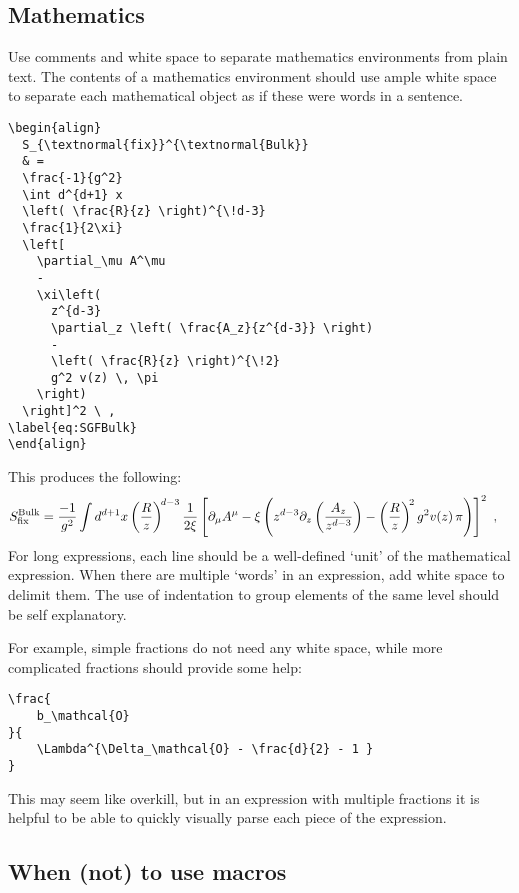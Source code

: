 \subsection{Mathematics}

Use comments and white space to separate mathematics environments from plain text.
% 
The contents of a mathematics environment should use ample white space to separate each mathematical object as if these were words in a sentence.
% 
\begin{lstlisting}[style=latexstyle]
\begin{align}
  S_{\textnormal{fix}}^{\textnormal{Bulk}}
  & =
  \frac{-1}{g^2} 
  \int d^{d+1} x  
  \left( \frac{R}{z} \right)^{\!d-3}
  \frac{1}{2\xi}
  \left[
    \partial_\mu A^\mu
    -
    \xi\left( 
      z^{d-3} 
      \partial_z \left( \frac{A_z}{z^{d-3}} \right)
      -
      \left( \frac{R}{z} \right)^{\!2} 
      g^2 v(z) \, \pi
    \right)
  \right]^2 \ ,
\label{eq:SGFBulk}
\end{align}
\end{lstlisting}
% 
This produces the following:
\begin{align}
	S_{\textnormal{fix}}^{\textnormal{Bulk}}
	& =
	\frac{-1}{g^2} 
	\int d^{d+1} x  
	\left( \frac{R}{z} \right)^{\!d-3}\frac{1}{2\xi}
	\left[
	    \partial_\mu A^\mu
	    -
	    \xi\left( 
	        z^{d-3} \partial_z \left(\frac{A_z}{z^{d-3}}\right)
	        -
	        \left(\frac{R}{z}\right)^{\!2} g^2 v(z)\, \pi
	    \right)
	\right]^2 \ ,
\end{align}
For long expressions, each line should be a well-defined `unit' of the mathematical expression. When there are multiple `words' in an expression, add white space to delimit them. The use of indentation to group elements of the same level should be self explanatory.

For example, simple fractions do not need any white space, while more complicated fractions should provide some help:
% 
\begin{lstlisting}[style=latexstyle]
\frac{ 
	b_\mathcal{O}
}{
	\Lambda^{\Delta_\mathcal{O} - \frac{d}{2} - 1 }
} 
\end{lstlisting}
% 
This may seem like overkill, but in an expression with multiple fractions it is helpful to be able to quickly visually parse each piece of the expression.


\subsection{When (not) to use macros}

